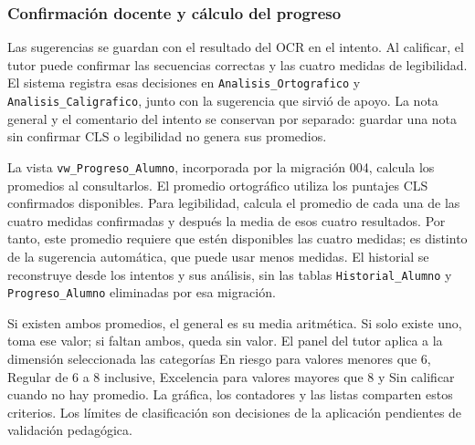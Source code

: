 \subsubsection{Confirmación docente y cálculo del progreso}

Las sugerencias se guardan con el resultado del OCR en el intento. Al calificar, el tutor puede confirmar las secuencias correctas y las cuatro medidas de legibilidad. El sistema registra esas decisiones en \texttt{Analisis\_Ortografico} y \texttt{Analisis\_Caligrafico}, junto con la sugerencia que sirvió de apoyo. La nota general y el comentario del intento se conservan por separado: guardar una nota sin confirmar CLS o legibilidad no genera sus promedios.

La vista \texttt{vw\_Progreso\_Alumno}, incorporada por la migración 004, calcula los promedios al consultarlos. El promedio ortográfico utiliza los puntajes CLS confirmados disponibles. Para legibilidad, calcula el promedio de cada una de las cuatro medidas confirmadas y después la media de esos cuatro resultados. Por tanto, este promedio requiere que estén disponibles las cuatro medidas; es distinto de la sugerencia automática, que puede usar menos medidas. El historial se reconstruye desde los intentos y sus análisis, sin las tablas \texttt{Historial\_Alumno} y \texttt{Progreso\_Alumno} eliminadas por esa migración.

Si existen ambos promedios, el general es su media aritmética. Si solo existe uno, toma ese valor; si faltan ambos, queda sin valor. El panel del tutor aplica a la dimensión seleccionada las categorías En riesgo para valores menores que 6, Regular de 6 a 8 inclusive, Excelencia para valores mayores que 8 y Sin calificar cuando no hay promedio. La gráfica, los contadores y las listas comparten estos criterios. Los límites de clasificación son decisiones de la aplicación pendientes de validación pedagógica.
